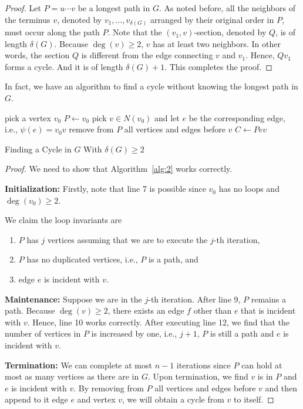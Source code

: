 \documentclass[thmcnt=section, 12pt, color=cyan]{my-elegantbook}
\begin{document}
\begin{proof}
	Let $P = u \cdots v$ 
	be a longest path in $G$.
	As noted before, all the neighbors of 
	the terminus $ v $,
	denoted by $v_1, \ldots, v_{\delta(G)}$
	arranged by their original order in $P$,
	must occur along the path $P$.
	Note that the $(v_1, v)$-section,
	denoted by $Q$,
	is of length $\delta(G)$.
	Because $\deg(v) \geq 2$, 
	$v$ has at least two neighbors. 
	In other words,
	the section $Q$ is different from the edge 
	connecting $v$ and $v_1$.
	Hence, $Q v_1$ forms a cycle.
	And it is of length $\delta(G) + 1$.
	This completes the proof.
\end{proof}

In fact, we have an algorithm to find a cycle without knowing the longest path in $G$.

\begin{algorithm}[ht]
    pick a vertex $v_0$ \; 
    $P \gets v_0$ \;
    pick $v \in N(v_0)$ and let $e$ be the corresponding edge, i.e., $\psi(e) = v_0 v$ \;
    remove from $P$ all vertices and edges before $v$ \;
    $C \gets P e v$ \;
    \caption{Finding a Cycle in $G$ With $\delta(G) \geq 2$}
    \label{alg:2}
\end{algorithm}

\begin{proof}
We need to show that Algorithm~\ref{alg:2} works correctly. 
    
\noindent \textbf{Initialization:} Firstly, note that line 7 is possible 
since $v_0$ has no loops and $\deg(v_0) \geq 2$. 

We claim the loop invariants are
\begin{enumerate}
    \item $P$ has $j$ vertices assuming that 
		we are to execute the $j$-th iteration,
    \item $P$ has no duplicated vertices, i.e., $P$ is a path, and
    \item edge $e$ is incident with $v$.
\end{enumerate}

\noindent \textbf{Maintenance:} Suppose we are in the $j$-th iteration. 
After line 9, $P$ remains a path. Because $\deg(v) \geq 2$, 
there exists an edge $f$ other than $e$ that is incident with $v$. 
Hence, line 10 works correctly. 
After executing line 12, we find that the number of vertices in $P$ is increased by one, i.e., $j+1$, 
$P$ is still a path and $e$ is incident with $v$.

\noindent \textbf{Termination:} We can complete at most $n-1$ iterations 
since $P$ can hold at most as many vertices as there are in $G$. 
Upon termination, 
we find $v$ is in $P$ and $e$ is incident with $v$. 
By removing from $P$ all vertices and edges before $v$ 
and then append to it edge $e$ and vertex $v$, 
we will obtain a cycle from $v$ to itself. 
\end{proof}
\end{document}
